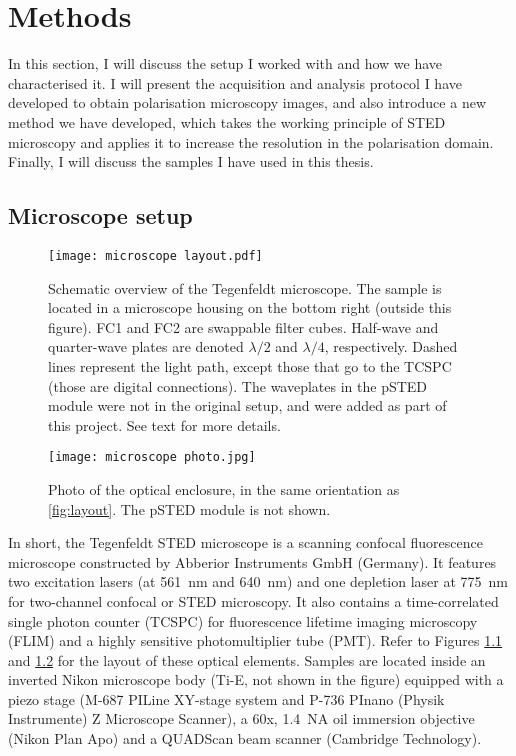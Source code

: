 \chapter{Methods}

In this section, I will discuss the setup I worked with and how we have characterised it. I will present the acquisition and analysis protocol I have developed to obtain polarisation microscopy images, and also introduce a new method we have developed, which takes the working principle of STED microscopy and applies it to increase the resolution in the polarisation domain. Finally, I will discuss the samples I have used in this thesis.

\section{Microscope setup}

\begin{figure}[h!]
	\centering
	\texttt{[image: microscope layout.pdf]}
	\caption{
		Schematic overview of the Tegenfeldt microscope. The sample is located in a microscope housing on the bottom right (outside this figure). FC1 and FC2 are swappable filter cubes. Half-wave and quarter-wave plates are denoted $ \lambda/2 $ and $ \lambda/4 $, respectively. Dashed lines represent the light path, except those that go to the TCSPC (those are digital connections). The waveplates in the pSTED module were not in the original setup, and were added as part of this project. See text for more details.
	}
	\label{fig:layout}
\end{figure}

\begin{figure}
	\centering
	\texttt{[image: microscope photo.jpg]}
	\caption{
		Photo of the optical enclosure, in the same orientation as \autoref{fig:layout}. The pSTED module is not shown.
	}
	\label{fig:microscope photo}
\end{figure}

In short, the Tegenfeldt STED microscope is a scanning confocal fluorescence microscope constructed by Abberior Instruments GmbH (Germany). It features two excitation lasers (at 561~nm and 640~nm) and one depletion laser at 775~nm for two-channel confocal or STED microscopy. It also contains a time-correlated single photon counter (TCSPC) for fluorescence lifetime imaging microscopy (FLIM) and a highly sensitive photomultiplier tube (PMT). Refer to Figures \ref{fig:layout} and \ref{fig:microscope photo} for the layout of these optical elements. Samples are located inside an inverted Nikon microscope body (Ti-E, not shown in the figure) equipped with a piezo stage (M-687 PILine XY-stage system and P-736 PInano (Physik Instrumente) Z Microscope Scanner), a 60x, 1.4~NA oil immersion objective (Nikon Plan Apo) and a QUADScan beam scanner (Cambridge Technology).

